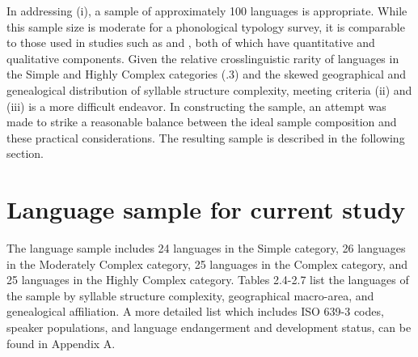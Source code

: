   In addressing (i), a sample of approximately 100 languages is appropriate. While this sample size is moderate for a phonological typology survey, it is comparable to those used in studies such as \citet{Bateman2007} and \citet{BybeeEasterday2019}, both of which have quantitative and qualitative components. Given the relative crosslinguistic rarity of languages in the Simple and Highly Complex categories (.3) and the skewed geographical and genealogical distribution of syllable structure complexity, meeting criteria (ii) and (iii) is a more difficult endeavor. In constructing the sample, an attempt was made to strike a reasonable balance between the ideal sample composition and these practical considerations. The resulting sample is described in the following section.

\section{\rmfamily} 
\section{Language sample for current study}\label{sec:2.4}

  The language sample includes 24 languages in the Simple category, 26 languages in the Moderately Complex category, 25 languages in the Complex category, and 25 languages in the Highly Complex category. Tables 2.4-2.7 list the languages of the sample by syllable structure complexity, geographical macro-area, and genealogical affiliation. A more detailed list which includes ISO 639-3 codes, speaker populations, and language endangerment and development status, can be found in Appendix A.

